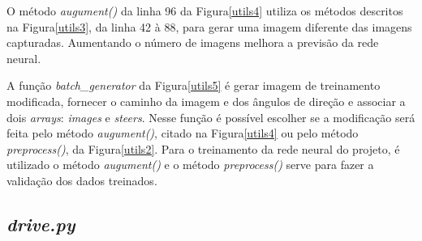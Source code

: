 \begin{figure}[H]
	\centering
\end{figure}

O método \textit{augument()} da linha 96 da Figura\ref{utils4} utiliza os métodos descritos na Figura\ref{utils3}, da linha 42 à 88, para gerar uma imagem diferente das imagens capturadas. Aumentando o número de imagens melhora a previsão da rede neural.

\begin{figure}[H]
	\centering
\end{figure}

A função \textit{batch\_generator} da Figura\ref{utils5} é gerar imagem de treinamento modificada, fornecer o caminho da imagem e dos ângulos de direção e associar a dois \textit{arrays}: \textit{images} e \textit{steers}. Nesse função é possível escolher se a modificação será feita pelo método \textit{augument()}, citado na Figura\ref{utils4} ou pelo método \textit{preprocess()}, da Figura\ref{utils2}. Para o treinamento da rede neural do projeto, é utilizado o método \textit{augument()} e o método \textit{preprocess()} serve para fazer a validação dos dados treinados.

\subsection{\textit{drive.py}}
\label{sec:drive.py}

